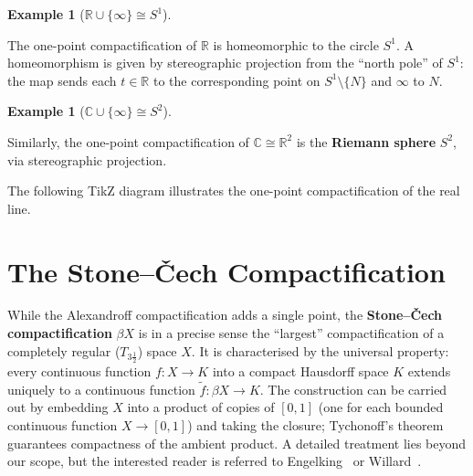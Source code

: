 \documentclass[11pt,a4paper,twoside]{book}
\theoremstyle{remark}
\theoremstyle{definition}
\newtheorem{exampleplain}[theorem]{Example}
\theoremstyle{definition}
\newenvironment{example}[1][]{%
  \begin{exampleplain}[#1]\itshape
}{%
  \end{exampleplain}
}
\begin{document}
\begin{example}[$\mathbb{R} \cup \{\infty\} \cong S^1$]
\label{ex:one-point-R}
The one-point compactification of $\mathbb{R}$ is homeomorphic to the circle
$S^1$.  A homeomorphism is given by stereographic projection from the
``north pole'' of $S^1$: the map sends each $t \in \mathbb{R}$ to the
corresponding point on $S^1 \setminus \{N\}$ and $\infty$ to $N$.
\end{example}

\begin{example}[$\mathbb{C} \cup \{\infty\} \cong S^2$]
\label{ex:one-point-C}
Similarly, the one-point compactification of $\mathbb{C} \cong \mathbb{R}^2$
is the \textbf{Riemann sphere} $S^2$, via stereographic
projection.
\end{example}

The following TikZ diagram illustrates the one-point compactification of the
real line.

\begin{center}
\end{center}

\section{The Stone--\v{C}ech Compactification}
\label{sec:stone-cech}

While the Alexandroff compactification adds a single point, the
\textbf{Stone--\v{C}ech compactification} $\beta X$ is in a precise sense the
``largest'' compactification of a completely regular ($T_{3\frac{1}{2}}$) space
$X$.  It is characterised by the universal property: every continuous function
$f \colon X \to K$ into a compact Hausdorff space $K$ extends uniquely to a
continuous function $\tilde{f} \colon \beta X \to K$.  The construction can be
carried out by embedding $X$ into a product of copies of $[0,1]$ (one for each
bounded continuous function $X \to [0,1]$) and taking the closure; Tychonoff's
theorem guarantees compactness of the ambient product.  A detailed treatment
lies beyond our scope, but the interested reader is referred to
Engelking~\cite{engelking1989} or Willard~\cite{willard}.
\end{document}
